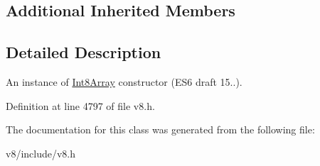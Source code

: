 \subsection*{Additional Inherited Members}


\subsection{Detailed Description}
An instance of \mbox{\hyperlink{classv8_1_1Int8Array}{Int8\+Array}} constructor (E\+S6 draft 15..). 

Definition at line 4797 of file v8.\+h.



The documentation for this class was generated from the following file\+:\begin{DoxyCompactItemize}
\item 
v8/include/v8.\+h\end{DoxyCompactItemize}
